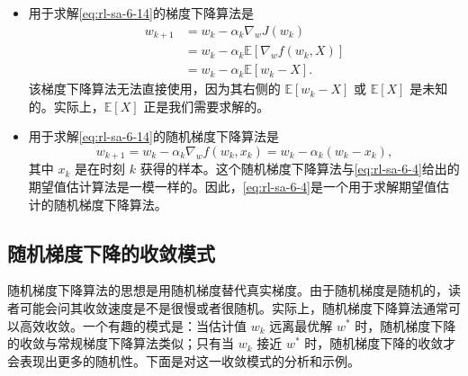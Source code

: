 \begin{itemize}
  \item 用于求解\eqref{eq:rl-sa-6-14}的梯度下降算法是
  \begin{equation}
  \begin{aligned}
  w_{k+1} &= w_k - \alpha_k \nabla_w J(w_k) \\
  &= w_k - \alpha_k \mathbb{E}[\nabla_w f(w_k, X)] \\
  &= w_k - \alpha_k \mathbb{E}[w_k - X].
  \end{aligned}
  \end{equation}
  该梯度下降算法无法直接使用，因为其右侧的 $\mathbb{E}[w_k - X]$ 或 $\mathbb{E}[X]$ 是未知的。实际上，$\mathbb{E}[X]$ 正是我们需要求解的。

  \item 用于求解\eqref{eq:rl-sa-6-14}的随机梯度下降算法是
  \begin{equation}
  w_{k+1} = w_k - \alpha_k \nabla_w f(w_k, x_k) = w_k - \alpha_k (w_k - x_k),
  \end{equation}
  其中 $x_k$ 是在时刻 $k$ 获得的样本。这个随机梯度下降算法与\eqref{eq:rl-sa-6-4}给出的期望值估计算法是一模一样的。因此，\eqref{eq:rl-sa-6-4}是一个用于求解期望值估计的随机梯度下降算法。
\end{itemize}

\subsection{随机梯度下降的收敛模式}
\label{sec:rl-sa-sgd-pattern}

随机梯度下降算法的思想是用随机梯度替代真实梯度。由于随机梯度是随机的，读者可能会问其收敛速度是不是很慢或者很随机。实际上，随机梯度下降算法通常可以高效收敛。一个有趣的模式是：当估计值 $w_k$ 远离最优解 $w^*$ 时，随机梯度下降的收敛与常规梯度下降算法类似；只有当 $w_k$ 接近 $w^*$ 时，随机梯度下降的收敛才会表现出更多的随机性。下面是对这一收敛模式的分析和示例。

